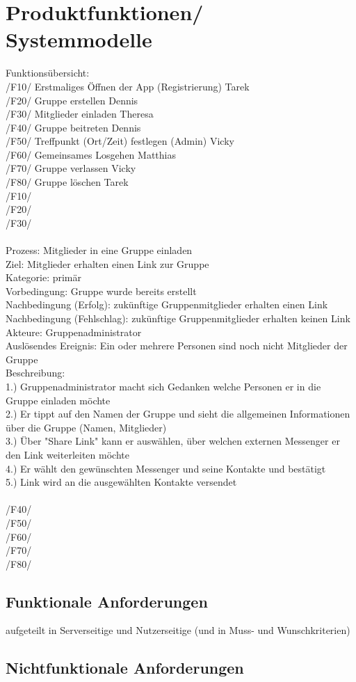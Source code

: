 \section{Produktfunktionen/ Systemmodelle}
Funktionsübersicht: \\
/F10/ Erstmaliges Öffnen der App (Registrierung) Tarek \\
/F20/ Gruppe erstellen Dennis \\
/F30/ Mitglieder einladen Theresa \\
/F40/ Gruppe beitreten Dennis \\
/F50/ Treffpunkt (Ort/Zeit) festlegen (Admin) Vicky \\
/F60/ Gemeinsames Losgehen Matthias \\
/F70/ Gruppe verlassen Vicky \\
/F80/ Gruppe löschen Tarek \\


/F10/ \\
/F20/ \\
/F30/ \\ \\
Prozess: Mitglieder in eine Gruppe einladen\\
Ziel: Mitglieder erhalten einen Link zur Gruppe\\
Kategorie: primär\\
Vorbedingung: Gruppe wurde bereits erstellt\\
Nachbedingung (Erfolg): zukünftige Gruppenmitglieder erhalten einen Link\\
Nachbedingung (Fehlschlag): zukünftige Gruppenmitglieder erhalten keinen Link\\
Akteure: Gruppenadministrator\\
Auslösendes Ereignis: Ein oder mehrere Personen sind noch nicht Mitglieder der Gruppe\\
Beschreibung:\\
1.) Gruppenadministrator macht sich Gedanken welche Personen er in die Gruppe einladen möchte\\
2.) Er tippt auf den Namen der Gruppe und sieht die allgemeinen Informationen über die Gruppe (Namen, Mitglieder)\\
3.) Über "Share Link" kann er auswählen, über welchen externen Messenger er den Link weiterleiten möchte\\
4.) Er wählt den gewünschten Messenger und seine Kontakte und bestätigt\\
5.) Link wird an die ausgewählten Kontakte versendet\\ \\
/F40/ \\
/F50/ \\
/F60/ \\
/F70/ \\
/F80/ \\

\subsection{Funktionale Anforderungen}
aufgeteilt in Serverseitige und Nutzerseitige 
(und in Muss- und Wunschkriterien)
\subsection{Nichtfunktionale Anforderungen}